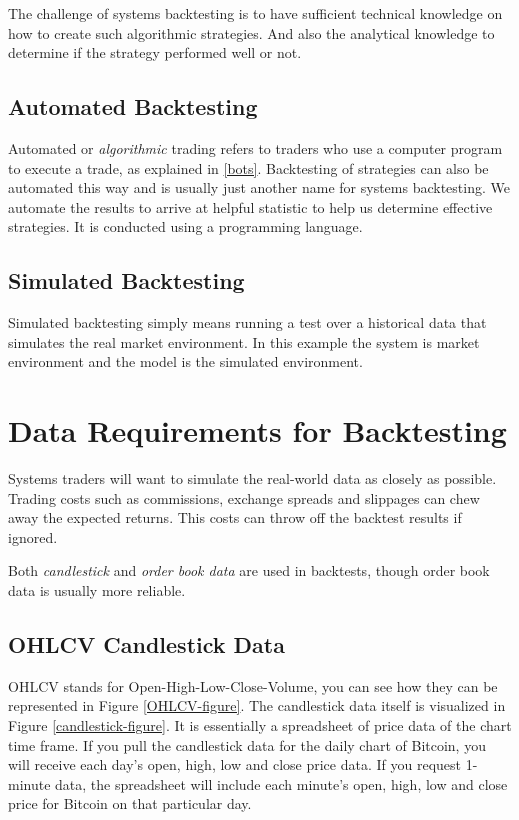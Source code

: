 The challenge of systems backtesting is to have sufficient technical knowledge on how to create such algorithmic strategies. And also the analytical knowledge to determine if the strategy performed well or not.

\subsection*{Automated Backtesting}
Automated or \emph{algorithmic} trading refers to traders who use a computer program to execute a trade, as explained in \ref{bots}. Backtesting of strategies can also be automated this way and is usually just another name for systems backtesting. We automate the results to arrive at helpful statistic to help us determine effective strategies. It is conducted using a programming language.

\subsection*{Simulated Backtesting}
Simulated backtesting simply means running a test over a historical data that simulates the real market environment. In this example the system is market environment and the model is the simulated environment.


\section{Data Requirements for Backtesting}
Systems traders will want to simulate the real-world data as closely as possible. Trading costs such as commissions, exchange spreads and slippages can chew away the expected returns. This costs can throw off the backtest results if ignored.

Both \emph{candlestick} and \emph{order book data} are used in backtests, though order book data is usually more reliable.

\subsection*{OHLCV Candlestick Data}
\label{ohlcv-candlestick-data}
OHLCV stands for Open-High-Low-Close-Volume, you can see how they can be represented in Figure \ref{OHLCV-figure}. The candlestick data itself is visualized in Figure \ref{candlestick-figure}. It is essentially a spreadsheet of price data of the chart time frame. If you pull the candlestick data for the daily chart of Bitcoin, you will receive each day's open, high, low and close price data. If you request 1-minute data, the spreadsheet will include each minute's open, high, low and close price for Bitcoin on that particular day.

